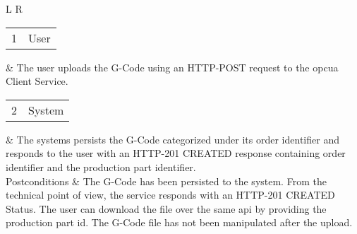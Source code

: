 \documentclass[
a4paper,
twoside,
headsepline,
cleardoublepage=empty,
parskip=half,
draft=false
]{scrbook}
\begin{document}
\begin{table}[hbtp]
\begin{tabular}{L R}
						\begin{tabular}{c c} 1 & User \end{tabular} & The user uploads the G-Code using an HTTP-POST request to the \gls{opcua} Client Service.
						\\ \midrule
						\begin{tabular}{c c} 2 & System \end{tabular} & The systems persists the G-Code categorized under its order identifier and responds to the user with an HTTP-201 CREATED response containing order identifier and the production part identifier.
						\\ \midrule
						Postconditions & The G-Code has been persisted to the system. From the technical point of view, the service responds with an HTTP-201 CREATED Status. The user can download the file over the same \gls{api} by providing the production part id. The G-Code file has not been manipulated after the upload.
						\\ \bottomrule
					\end{tabular}
				\end{table}
\end{document}
